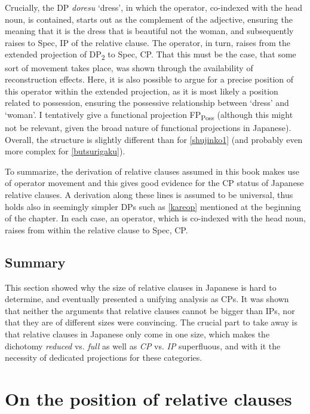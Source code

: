 Crucially, the DP \textit{doresu} `dress’, in which the operator, co-indexed with the head noun, is contained, starts out as the complement of the adjective, ensuring the meaning that it is the dress that is beautiful not the woman, and subsequently raises to Spec, IP of the relative clause. The operator, in turn, raises from the extended projection of DP\textsubscript{2} to Spec, CP. That this must be the case, that some sort of movement takes place, was shown through the availability of reconstruction effects. Here, it is also possible to argue for a precise position of this operator within the extended projection, as it is most likely a position related to possession, ensuring the possessive relationship between `dress’ and `woman’. I tentatively give a functional projection FP\textsubscript{Poss} (although this might not be relevant, given the broad nature of functional projections in Japanese). Overall, the structure is slightly different than for \ref{shujinko1} (and probably even more complex for \ref{butsurigaku}). 

To summarize, the derivation of relative clauses assumed in this book makes use of operator movement and this gives good evidence for the CP status of Japanese relative clauses. A derivation along these lines is assumed to be universal, thus holds also in seemingly simpler DPs such as \ref{kareop} mentioned at the beginning of the chapter. In each case, an operator, which is co-indexed with the head noun, raises from within the relative clause to Spec, CP.

\subsection{Summary}

This section showed why the size of relative clauses in Japanese is hard to determine, and eventually presented a unifying analysis as CPs. It was shown that neither the arguments that relative clauses cannot be bigger than IPs, nor that they are of different sizes were convincing. The crucial part to take away is that relative clauses in Japanese only come in one size, which makes the dichotomy \textit{reduced} vs. \textit{full} as well as \textit{CP} vs. \textit{IP} superfluous, and with it the necessity of dedicated projections for these categories.

\section{On the position of relative clauses} \label{complexity}

